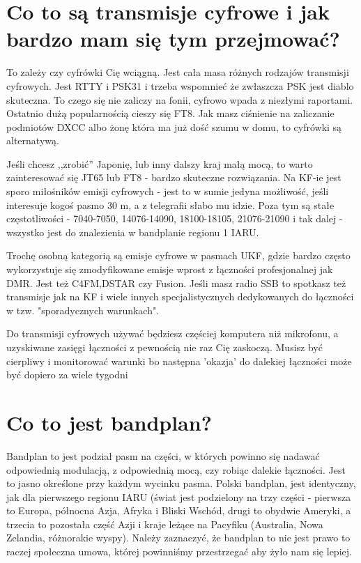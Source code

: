 \documentclass[a4paper,12pt]{article}
\begin{document}
\section{Co to są transmisje cyfrowe i jak bardzo mam się tym przejmować?}
To zależy czy cyfrówki Cię wciągną. 
Jest cała masa różnych rodzajów transmisji cyfrowych. Jest RTTY i PSK31 i trzeba wspomnieć że zwłaszcza PSK jest diablo skuteczna. To czego się nie zaliczy na fonii, cyfrowo wpada z niezłymi raportami. Ostatnio dużą popularnością cieszy się FT8.
Jak masz ciśnienie na zaliczanie podmiotów DXCC albo żonę która ma już dość szumu w domu, to cyfrówki są alternatywą.

Jeśli chcesz ,,zrobić'' Japonię, lub inny dalszy kraj małą mocą, to warto zainteresować się JT65 lub FT8 - bardzo skuteczne rozwiązania. Na KF-ie jest sporo miłośników emisji cyfrowych - jest to w sumie jedyna możliwość, jeśli interesuje kogoś pasmo 30 m, a z telegrafii słabo mu idzie. Poza tym są stałe częstotliwości - 7040-7050, 14076-14090, 18100-18105, 21076-21090 i tak dalej - wszystko jest do znalezienia w bandplanie regionu 1 IARU.

Trochę osobną kategorią są emisje cyfrowe w pasmach UKF, gdzie bardzo często wykorzystuje się zmodyfikowane emisje wprost z łączności profesjonalnej jak DMR. Jest też C4FM,DSTAR czy Fusion. Jeśli masz radio SSB to spotkasz też transmisje jak na KF i wiele innych specjalistycznych dedykowanych do łączności w tzw. "sporadycznych warunkach". 

Do transmisji cyfrowych używać będziesz częściej komputera niż mikrofonu, a uzyskiwane zasięgi łączności z pewnością nie raz Cię zaskoczą. Musisz być cierpliwy i monitorować warunki bo następna 'okazja' do dalekiej łączności może być dopiero za wiele tygodni

\section{Co to jest bandplan?}
Bandplan to jest podział pasm na części, w których powinno się nadawać odpowiednią modulacją, z odpowiednią mocą, czy robiąc dalekie łączności. Jest to jasno określone przy każdym wycinku pasma. 
Polski bandplan, jest identyczny, jak dla pierwszego regionu IARU (świat jest podzielony na trzy części - pierwsza to Europa, północna Azja, Afryka i Bliski Wschód, drugi to obydwie Ameryki, a trzecia to pozostała część Azji i kraje leżące na Pacyfiku (Australia, Nowa Zelandia, różnorakie wyspy). Należy zaznaczyć, że bandplan to nie jest prawo to raczej społeczna umowa, której powinniśmy przestrzegać aby żyło nam się lepiej. 
\end{document}
